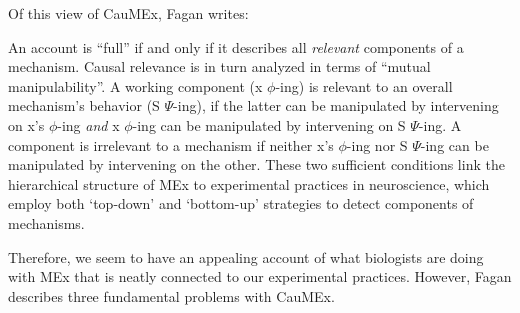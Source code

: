 Of this view of CauMEx, Fagan writes:

\begin{longquote}
An account is “full” if and only if it describes all \textit{relevant} components of a mechanism. Causal relevance is in turn analyzed in terms of “mutual manipulability”. A working component (x $\phi$-ing) is relevant to an overall
mechanism’s behavior (S $\Psi$-ing), if the latter can be manipulated by
intervening on x's $\phi$-ing \textit{and} x $\phi$-ing can be manipulated by intervening on S $\Psi$-ing. A component is irrelevant to a mechanism if neither
x's $\phi$-ing nor S $\Psi$-ing can be manipulated by intervening on the other.
These two sufficient conditions link the hierarchical structure of MEx to
experimental practices in neuroscience, which employ both ‘top-down’
and ‘bottom-up’ strategies to detect components of mechanisms. \cite[p.100]{Fagan2013}
\end{longquote}

Therefore, we seem to have an appealing account of what biologists are doing with MEx that is neatly connected to our experimental practices. However, Fagan describes three fundamental problems with CauMEx.


